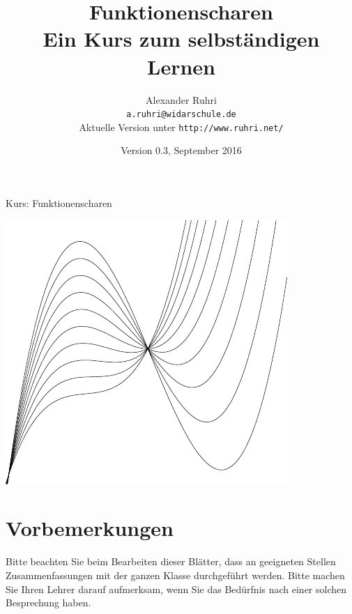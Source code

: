 \documentclass[11pt,a4paper,twoside,fleqn]{article}
\begin{document}
\renewcommand{\thepage}{Seite~\arabic{page}}
\renewcommand{\baselinestretch}{1.2}

\renewcommand{\labelenumi}{{\bf\arabic{enumi}.)}}
\renewcommand{\labelenumii}{{\bf\alph{enumii})}}
\renewcommand{\labelenumiii}{{\bf\roman{enumiii})}}

\renewcommand{\thecolumn}{{\bf\alph{column}\ }}
\newcommand{\labelcolumn}{{\bf\alph{column})\ \ \ }}
\setlength{\itemsep}{0pt}
\setlength{\mathindent}{0cm}





\pagestyle{myheadings}
%
{Kurs: Funktionenscharen\hfill}
\title{Funktionenscharen\\\large{Ein Kurs
    zum selbständigen Lernen}}
\author{Alexander Ruhri\\
  \small\texttt{a.ruhri@widarschule.de}\\
  \small Aktuelle Version unter \texttt{http://www.ruhri.net/}
}
\date{\small Version 0.3, September 2016}

\maketitle

{\centering\includegraphics[width=.6\linewidth]{pics/graph_title}

}

\section*{Vorbemerkungen}
Bitte beachten Sie beim Bearbeiten dieser Blätter, dass an geeigneten
Stellen Zusammenfassungen mit der ganzen Klasse durchgeführt
werden. Bitte machen Sie Ihren Lehrer darauf aufmerksam, wenn Sie das
Bedürfnis nach einer solchen Besprechung haben. 
\end{document}

